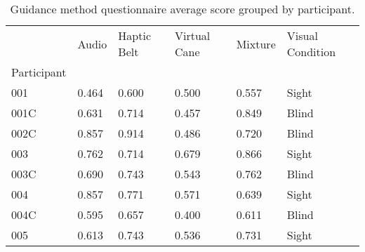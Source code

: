 
\begin{table}[!htb]
\centering
\caption{Guidance method questionnaire average score grouped by participant.}
\label{tab:questionnaire_average}
\begin{tabular}{llllll}
\toprule
{} &  Audio &  Haptic Belt &  Virtual Cane &  Mixture & Visual Condition \\
Participant &        &              &               &          &                  \\
\midrule
001         &  0.464 &        0.600 &         0.500 &    0.557 &            Sight \\
001C        &  0.631 &        0.714 &         0.457 &    0.849 &            Blind \\
002C        &  0.857 &        0.914 &         0.486 &    0.720 &            Blind \\
003         &  0.762 &        0.714 &         0.679 &    0.866 &            Sight \\
003C        &  0.690 &        0.743 &         0.543 &    0.762 &            Blind \\
004         &  0.857 &        0.771 &         0.571 &    0.639 &            Sight \\
004C        &  0.595 &        0.657 &         0.400 &    0.611 &            Blind \\
005         &  0.613 &        0.743 &         0.536 &    0.731 &            Sight \\
\bottomrule
\end{tabular}
\end{table}

